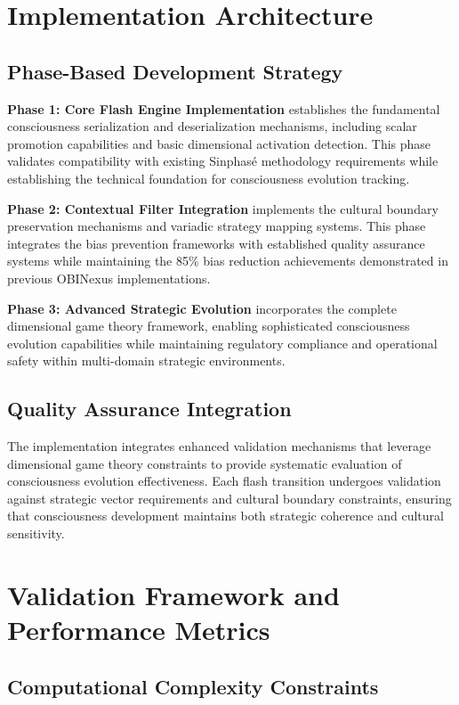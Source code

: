 \documentclass[12pt]{article}
\begin{document}
\section{Implementation Architecture}

\subsection{Phase-Based Development Strategy}

\textbf{Phase 1: Core Flash Engine Implementation} establishes the fundamental consciousness serialization and deserialization mechanisms, including scalar promotion capabilities and basic dimensional activation detection. This phase validates compatibility with existing Sinphasé methodology requirements while establishing the technical foundation for consciousness evolution tracking.

\textbf{Phase 2: Contextual Filter Integration} implements the cultural boundary preservation mechanisms and variadic strategy mapping systems. This phase integrates the bias prevention frameworks with established quality assurance systems while maintaining the 85\% bias reduction achievements demonstrated in previous OBINexus implementations.

\textbf{Phase 3: Advanced Strategic Evolution} incorporates the complete dimensional game theory framework, enabling sophisticated consciousness evolution capabilities while maintaining regulatory compliance and operational safety within multi-domain strategic environments.

\subsection{Quality Assurance Integration}

The implementation integrates enhanced validation mechanisms that leverage dimensional game theory constraints to provide systematic evaluation of consciousness evolution effectiveness. Each flash transition undergoes validation against strategic vector requirements and cultural boundary constraints, ensuring that consciousness development maintains both strategic coherence and cultural sensitivity.

\section{Validation Framework and Performance Metrics}

\subsection{Computational Complexity Constraints}
\end{document}
